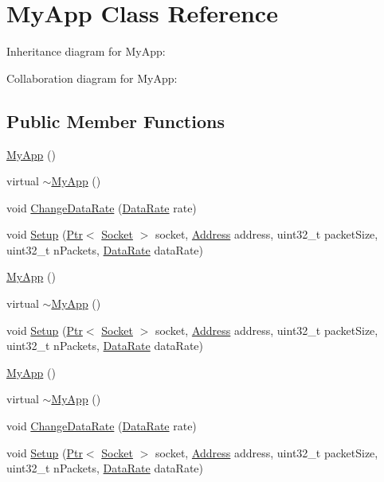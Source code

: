 \hypertarget{classMyApp}{}\section{My\+App Class Reference}
\label{classMyApp}


Inheritance diagram for My\+App\+:


Collaboration diagram for My\+App\+:
\subsection*{Public Member Functions}
\begin{DoxyCompactItemize}
\item 
\hyperlink{classMyApp_ab7ac5f53fc8ede4547052b028b001257}{My\+App} ()
\item 
virtual \hyperlink{classMyApp_ac3f9f12e37dee82e7c84c37816e9d1da}{$\sim$\+My\+App} ()
\item 
void \hyperlink{classMyApp_ac82012ce3ff19505f6a21fdf0062aaa6}{Change\+Data\+Rate} (\hyperlink{classns3_1_1DataRate}{Data\+Rate} rate)
\item 
void \hyperlink{classMyApp_a2cf14bc00422c7b4e52534147836216d}{Setup} (\hyperlink{classns3_1_1Ptr}{Ptr}$<$ \hyperlink{classns3_1_1Socket}{Socket} $>$ socket, \hyperlink{classns3_1_1Address}{Address} address, uint32\+\_\+t packet\+Size, uint32\+\_\+t n\+Packets, \hyperlink{classns3_1_1DataRate}{Data\+Rate} data\+Rate)
\item 
\hyperlink{classMyApp_ab7ac5f53fc8ede4547052b028b001257}{My\+App} ()
\item 
virtual \hyperlink{classMyApp_a75d6faab1daaa1843424f7ea578c60d7}{$\sim$\+My\+App} ()
\item 
void \hyperlink{classMyApp_a2cf14bc00422c7b4e52534147836216d}{Setup} (\hyperlink{classns3_1_1Ptr}{Ptr}$<$ \hyperlink{classns3_1_1Socket}{Socket} $>$ socket, \hyperlink{classns3_1_1Address}{Address} address, uint32\+\_\+t packet\+Size, uint32\+\_\+t n\+Packets, \hyperlink{classns3_1_1DataRate}{Data\+Rate} data\+Rate)
\item 
\hyperlink{classMyApp_ab7ac5f53fc8ede4547052b028b001257}{My\+App} ()
\item 
virtual \hyperlink{classMyApp_a75d6faab1daaa1843424f7ea578c60d7}{$\sim$\+My\+App} ()
\item 
void \hyperlink{classMyApp_ac82012ce3ff19505f6a21fdf0062aaa6}{Change\+Data\+Rate} (\hyperlink{classns3_1_1DataRate}{Data\+Rate} rate)
\item 
void \hyperlink{classMyApp_a2cf14bc00422c7b4e52534147836216d}{Setup} (\hyperlink{classns3_1_1Ptr}{Ptr}$<$ \hyperlink{classns3_1_1Socket}{Socket} $>$ socket, \hyperlink{classns3_1_1Address}{Address} address, uint32\+\_\+t packet\+Size, uint32\+\_\+t n\+Packets, \hyperlink{classns3_1_1DataRate}{Data\+Rate} data\+Rate)
\end{DoxyCompactItemize}
